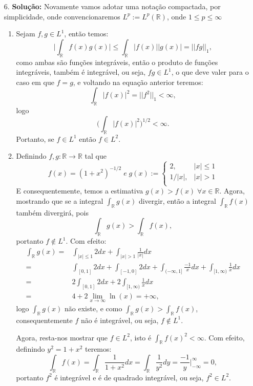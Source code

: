 \documentclass{article}
\begin{document}
\begin{enumerate}
		\item[6.] \textbf{Solução:} Novamente vamos adotar uma notação compactada, por simplicidade, onde convencionaremos $L^{p} := L^{p}(\mathbb{R})$, onde $1 \leq p \leq \infty$
			\begin{enumerate}
				\item Sejam $f, g \in L^{1}$, então temos:
				$$
				\Big| \int_{\mathbb{R}}f(x)g(x) \Big| \leq  \int_{\mathbb{R}}|f(x)||g(x)| = ||fg||_{1},
				$$
				como ambas são funções integráveis, então o produto de funções integráveis, também é integrável, ou seja, $fg \in L^{1}$, o que deve valer para o caso em que $f=g$, e voltando na equação anterior teremos:
				$$
				\int_{\mathbb{R}}|f(x)|^{2} = ||f^{2}||_{1} < \infty,
				$$
				logo
				$$
				\Big( \int_{\mathbb{R}}|f(x)|^{2} \Big)^{1/2}  < \infty.
				$$
				Portanto, se $f \in L^{1}$ então $f \in L^{2}$.
				
				\item Definindo $f, g:\mathbb{R} \to \mathbb{R} $ tal que 
				$$
				f(x) = (1+x^{2})^{-1/2} \; e \;
				g(x) := \left\{
				\begin{array}{cc}
				2, & |x| \leq 1 \\
				1/|x|, & |x| > 1 \\
				\end{array}
				\right.
				$$
				E consequentemente, temos a estimativa $g(x) > f(x) \; \forall x \in \mathbb{R}$. Agora, mostrando que se a integral $\int_{\mathbb{R}}g(x)$ divergir, então a integral $\int_{\mathbb{R}}f(x)$ também divergirá, pois
				$$
				\int_{\mathbb{R}}g(x) > \int_{\mathbb{R}}f(x),
				$$
				portanto $f \notin L^{1}$. Com efeito:
				$$
				\begin{aligned}
				\int_{\mathbb{R}}g(x) 
				= & \int_{|x| \leq 1} 2 dx + \int_{|x| > 1} \frac{1}{|x|} dx \\
				= & \int_{[0,1]} 2 dx + \int_{[-1,0]} 2 dx + \int_{(-\infty, 1]}\frac{-1}{x}dx + \int_{[1, \infty)}\frac{1}{x}dx \\
				= & 2\int_{[0,1]} 2 dx +  2\int_{[1, \infty)}\frac{1}{x}dx \\
				= & 4 + 2 \lim_{x \to \infty} \ln(x) = +\infty,  
				\end{aligned}
				$$
				logo 
				$\int_{\mathbb{R}}g(x)$ não existe, e como $\int_{\mathbb{R}}g(x)> \int_{\mathbb{R}}f(x)$, consequentemente $f$ não é integrável, ou seja, $f \notin L^{1}$.
				
				Agora, resta-nos mostrar que $f \in L^{2}$, isto é $\int_{\mathbb{R}}f(x)^{2} <\infty$. Com efeito, definindo $y^{2} = 1+x^{2}$ teremos:
				$$
				\int_{\mathbb{R}}f(x) 
				= \int_{\mathbb{R}}\frac{1}{1+x^{2}}dx = \int_{\mathbb{R}}\frac{1}{y^{2}}dy = \frac{ -1}{y} \Big|^{\infty}_{-\infty} = 0,
				$$
				portanto $f^{2}$ é integrável e é de quadrado integrável, ou seja, $f^{2} \in L^{2}$.
				

\end{enumerate}
\end{enumerate}
\end{document}

